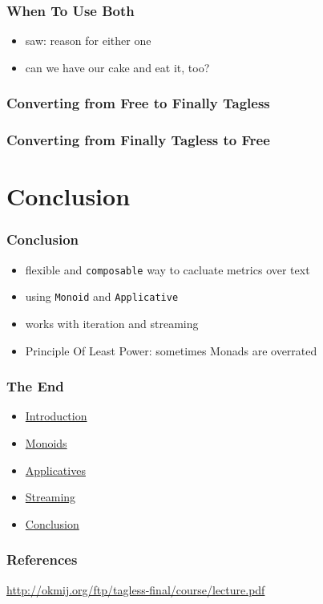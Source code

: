 \documentclass[aspectratio=169]{beamer}
\begin{document}
\begin{frame}
  \frametitle{When To Use Both}
  \begin{itemize}
  \item saw: reason for either one
  \item can we have our cake and eat it, too?
  \end{itemize}
\end{frame}

\begin{frame}
  \frametitle{Converting from Free to Finally Tagless}
\end{frame}

\begin{frame}
  \frametitle{Converting from Finally Tagless to Free}
\end{frame}

\section{Conclusion}\label{sec:conclusion}

\begin{frame}
  \frametitle{Conclusion}
  \begin{itemize}
  \item flexible and \texttt{composable} way to cacluate metrics over text
  \item using \texttt{Monoid} and \texttt{Applicative}
  \item works with iteration and streaming
  \item Principle Of Least Power: sometimes Monads are overrated
  \end{itemize}
\end{frame}

\begin{frame}
  \frametitle{The End}
  \begin{itemize}
  \item \hyperref[sec:introduction]{Introduction}
  \item \hyperref[sec:monoids]{Monoids}
  \item \hyperref[sec:applicatives]{Applicatives}
  \item \hyperref[sec:streaming]{Streaming}
  \item \hyperref[sec:conclusion]{Conclusion}
  \end{itemize}
  \vfill
\end{frame}

\begin{frame}
  \frametitle{References}
  \begin{center}
    \url{http://okmij.org/ftp/tagless-final/course/lecture.pdf}
  \end{center}
\end{frame}

\appendix{}
\end{document}
